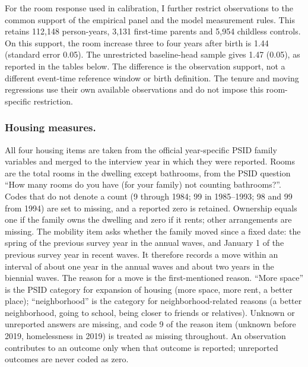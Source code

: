 For the room response used in calibration, I further restrict observations
to the common support of the empirical panel and the model measurement
rules. This retains 112,148 person-years, 3,131 first-time parents and 5,954
childless controls. On this support, the room increase three to four years
after birth is 1.44 (standard error 0.05). The unrestricted baseline-head
sample gives 1.47 (0.05), as reported in the tables below. The difference is
the observation support, not a different event-time reference window or
birth definition. The tenure and moving regressions use their own available
observations and do not impose this room-specific restriction.

\subsubsection*{Housing measures.}
All four housing items are taken from the official year-specific PSID family
variables and merged to the interview year in which they were reported. Rooms
are the total rooms in the dwelling except bathrooms, from the PSID question
``How many rooms do you have (for your family) not counting bathrooms?''. Codes that do not denote a count (9
through 1984; 99 in 1985--1993; 98 and 99 from 1994) are set to missing, and a
reported zero is retained. Ownership equals one if the family owns the
dwelling and zero if it rents; other arrangements are missing. The mobility
item asks whether the family moved since a fixed date: the spring of the
previous survey year in the annual waves, and January 1 of the previous survey
year in recent waves. It therefore records a move within an interval of about
one year in the annual waves and about two years in the biennial waves. The reason for a move is the first-mentioned
reason. ``More space'' is the PSID category for expansion of housing (more space,
more rent, a better place); ``neighborhood'' is the category for
neighborhood-related reasons (a better neighborhood, going to school, being
closer to friends or relatives). Unknown or unreported answers are missing, and code 9
of the reason item (unknown before 2019, homelessness in 2019) is treated as
missing throughout. An observation contributes to an outcome only when that
outcome is reported; unreported outcomes are never coded as zero.

